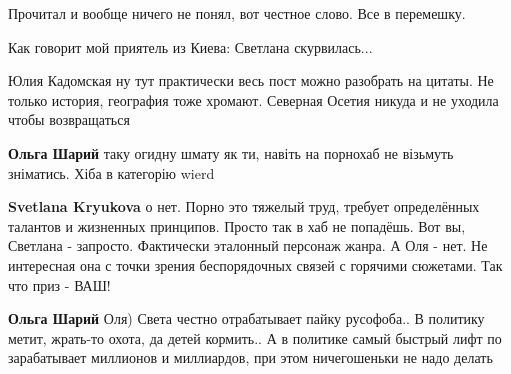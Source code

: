 \begin{itemize}
\begin{itemize}
 
Прочитал и вообще ничего не понял, вот честное слово. Все в перемешку.

 
Как говорит мой приятель из Киева: Светлана скурвилась...

 
Юлия Кадомская ну тут практически весь пост можно разобрать на цитаты. Не только история, география тоже хромают. Северная Осетия никуда и не уходила чтобы возвращаться

 
\textbf{Ольга Шарий} таку огидну шмату як ти, навіть на порнохаб не візьмуть зніматись. Хіба в категорію wierd

 
\textbf{Svetlana Kryukova} о нет. Порно это тяжелый труд, требует определённых талантов и жизненных принципов. Просто так в хаб не попадёшь. Вот вы, Светлана - запросто. Фактически эталонный персонаж жанра. А Оля - нет. Не интересная она с точки зрения беспорядочных связей с горячими сюжетами. Так что приз - ВАШ!

 
\textbf{Ольга Шарий} Оля) Света честно отрабатывает пайку русофоба.. В политику метит, жрать-то охота, да детей кормить.. А в политике самый быстрый лифт по зарабатывает миллионов и миллиардов, при этом ничегошеньки не надо делать


\end{itemize}
\end{itemize}
